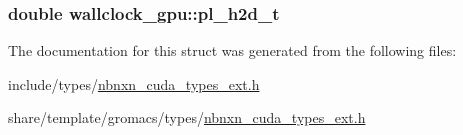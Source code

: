 \hypertarget{structwallclock__gpu_a8fd837503cc4bb25d0ef1c65ba517744}{
\subsubsection[{pl\-\_\-h2d\-\_\-t}]{\setlength{\rightskip}{0pt plus 5cm}double {\bf wallclock\-\_\-gpu\-::pl\-\_\-h2d\-\_\-t}}}\label{structwallclock__gpu_a8fd837503cc4bb25d0ef1c65ba517744}


\-The documentation for this struct was generated from the following files\-:\begin{DoxyCompactItemize}
\item 
include/types/\hyperlink{include_2types_2nbnxn__cuda__types__ext_8h}{nbnxn\-\_\-cuda\-\_\-types\-\_\-ext.\-h}\item 
share/template/gromacs/types/\hyperlink{share_2template_2gromacs_2types_2nbnxn__cuda__types__ext_8h}{nbnxn\-\_\-cuda\-\_\-types\-\_\-ext.\-h}\end{DoxyCompactItemize}
